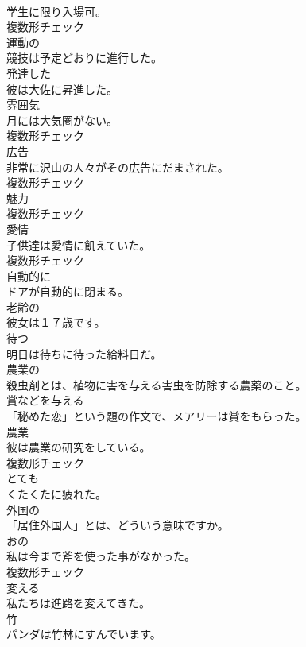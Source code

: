 \documentclass[8pt]{extreport}
\begin{document}
\begin{CJK}{UTF8}{min}
\\	学生に限り入場可。	
\\	複数形チェック
\\	[形容詞]	運動の	
\\	競技は予定どおりに進行した。	
\\	[形容詞]	発達した	
\\	彼は大佐に昇進した。	
\\	[名詞]	雰囲気	
\\	月には大気圏がない。	
\\	複数形チェック
\\	[名詞]	広告	
\\	非常に沢山の人々がその広告にだまされた。	
\\	複数形チェック
\\	[名詞]	魅力	
\\	複数形チェック
\\	[名詞]	愛情	
\\	子供達は愛情に飢えていた。	
\\	複数形チェック
\\	[副詞]	自動的に	
\\	ドアが自動的に閉まる。	
\\	[形容詞]	老齢の	
\\	彼女は１７歳です。	
\\	[動詞]	待つ	
\\	明日は待ちに待った給料日だ。	
\\	[形容詞]	農業の	
\\	殺虫剤とは、植物に害を与える害虫を防除する農薬のこと。	
\\	[動詞]	賞などを与える	
\\	「秘めた恋」という題の作文で、メアリーは賞をもらった。	
\\	[名詞]	農業	
\\	彼は農業の研究をしている。	
\\	複数形チェック
\\	[副詞]	とても	
\\	くたくたに疲れた。	
\\	[形容詞]	外国の	
\\	「居住外国人」とは、どういう意味ですか。	
\\	[名詞]	おの	
\\	私は今まで斧を使った事がなかった。	
\\	複数形チェック
\\	[動詞]	変える	
\\	私たちは進路を変えてきた。	
\\	[名詞]	竹	
\\	パンダは竹林にすんでいます。	

\end{CJK}
\end{document}
